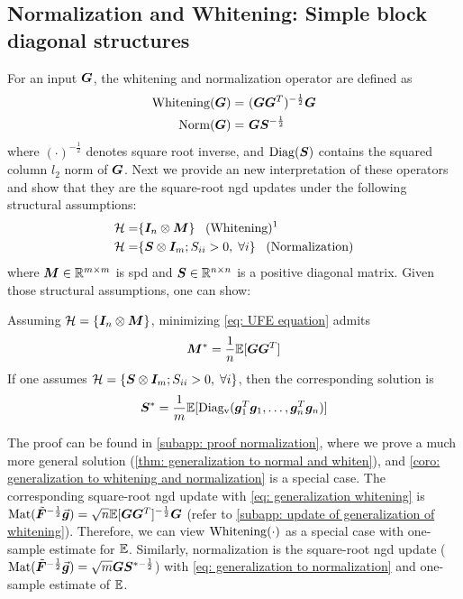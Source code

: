 \subsection{Normalization and Whitening: Simple block diagonal structures}
\label{subsec: sve}
For an input ${\bm{G}}$, the whitening and normalization operator are defined as 
\begin{align*}
    \operatorname{Whitening}({\bm{G}}) =& ~({\bm{G}}{\bm{G}}^T)^{-\frac{1}{2}}{\bm{G}}\\
    \operatorname{Norm}({\bm{G}}) =& ~{\bm{G}}{\bm{S}}^{-\frac{1}{2}}
    \label{eq: whiten and normal operator}
\end{align*}
where $(\cdot)^{-\frac{1}{2}}$ denotes square root inverse, and $\operatorname{Diag}({\bm{S}})$ contains the squared column $l_2$ norm of ${\bm{G}}$. Next we provide an new interpretation of these operators and show that they are the square-root \gls{ngd} updates under the following structural assumptions:
\begin{align}
    \family =& \{\mI_n\otimes \mM\} \;\;\; (\text{Whitening}) \text{\footnotemark}  \\
    \family =& \{\mS\otimes \mI_m; S_{ii}>0,\; \forall i\} \;\;\; (\text{Normalization}) 
\end{align}
where ${\bm{M}}\in\mathbb{R}^{m\times m}$ is \gls{spd} and ${\bm{S}}\in\mathbb{R}^{n\times n}$ is a positive diagonal matrix. Given those structural assumptions, one can show:


\begin{proposition}
    Assuming $\mathcal{H} = \{{\bm{I}}_n\otimes {\bm{M}}\}$, minimizing \cref{eq: UFE equation} admits
    \begin{align}
        {\bm{M}}^* = \frac{1}{n}\mathbb{E}[{\bm{G}}{\bm{G}}^T]
        \label{eq: generalization whitening}
    \end{align}
    If one assumes $\mathcal{H} = \{{\bm{S}}\otimes {\bm{I}}_m; S_{ii}>0,\; \forall i\}$, then the corresponding solution is 
    \begin{align}
        {\bm{S}}^* = \frac{1}{m}\mathbb{E}[\operatorname{Diag_v}({\bm{g}}_1^T{\bm{g}}_1,\ldots,{\bm{g}}_n^T{\bm{g}}_n)]
    \label{eq: generalization to normalization}
    \end{align}
    \label{coro: generalization to whitening and normalization}
\end{proposition}
The proof can be found in \cref{subapp: proof normalization}, where we prove a much more general solution (\cref{thm: generalization to normal and whiten}), and \cref{coro: generalization to whitening and normalization} is a special case. The corresponding square-root \gls{ngd} update with \cref{eq: generalization whitening} is $\operatorname{Mat}(\tilde{\bm{F}}^{-\frac{1}{2}}\vec{\bm{g}})= \sqrt{n}\mathbb{E}[{\bm{G}}{\bm{G}}^T]^{-\frac{1}{2}}{\bm{G}}$ (refer to \cref{subapp: update of generalization of whitening}). Therefore, we can view $\operatorname{Whitening}(\cdot)$ as a special case with one-sample estimate for $\mathbb{E}$. Similarly, normalization is the square-root \gls{ngd} update ($\operatorname{Mat}(\tilde{\bm{F}}^{-\frac{1}{2}}\vec{\bm{g}})= \sqrt{m}{\bm{G}}{\bm{S}}^{*-\frac{1}{2}}$) with \cref{eq: generalization to normalization} and one-sample estimate of $\mathbb{E}$.

